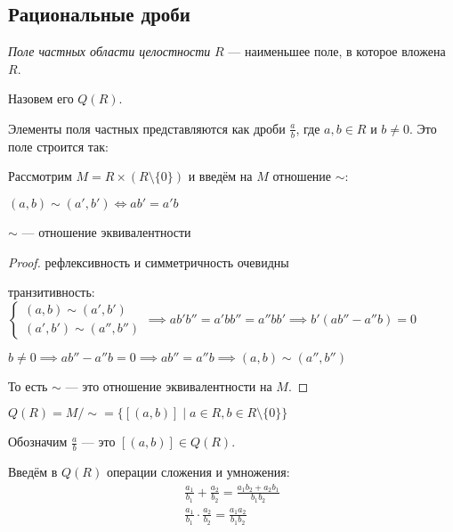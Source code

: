 \subsection{Рациональные дроби}

\begin{defn}
    \emph{Поле частных области целостности} $R$ --- наименьшее поле, в которое вложена $R$.

    Назовем его $Q(R)$.
\end{defn}

Элементы поля частных представляются как дроби $\frac{a}{b}$, где $a, b \in R$ и $b \neq 0$. Это поле строится так:

Рассмотрим $M = R \times (R \setminus \{0\})$ и введём на $M$ отношение $\sim$:

 $(a, b) \sim (a', b') \iff ab' = a'b$
\begin{theorem-non}
    $\sim$ --- отношение эквивалентности
\end{theorem-non}

\begin{proof}
    рефлексивность и симметричность очевидны

    транзитивность:
    $\begin{cases}
        (a, b) \sim (a', b')\\
        (a', b') \sim (a'', b'')
    \end{cases} \implies ab'b'' = a'bb'' = a''bb' \implies b'(ab'' - a''b) = 0$

    $b \neq 0 \implies ab'' - a''b = 0 \implies ab'' = a''b \implies (a, b) \sim (a'', b'')$


    То есть $\sim$ --- это отношение эквивалентности на $M$.
\end{proof}

\begin{defn}
    $Q(R) = M / \sim = \{ [(a, b)] \mid a \in R, b \in R \setminus \{0\} \}$    
\end{defn}

\begin{defn}
    Обозначим $\frac{a}{b}$ --- это $[(a, b)] \in Q(R)$.
\end{defn}

\begin{theorem-non}
    Введём в $Q(R)$ операции сложения и умножения:
    \begin{gather*}    
        \frac{a_1}{b_1} + \frac{a_2}{b_2} = \frac{a_1b_2 + a_2b_1}{b_1b_2}\\
        \frac{a_1}{b_1} \cdot \frac{a_2}{b_2} = \frac{a_1a_2}{b_1b_2}
    \end{gather*}
\end{theorem-non}


